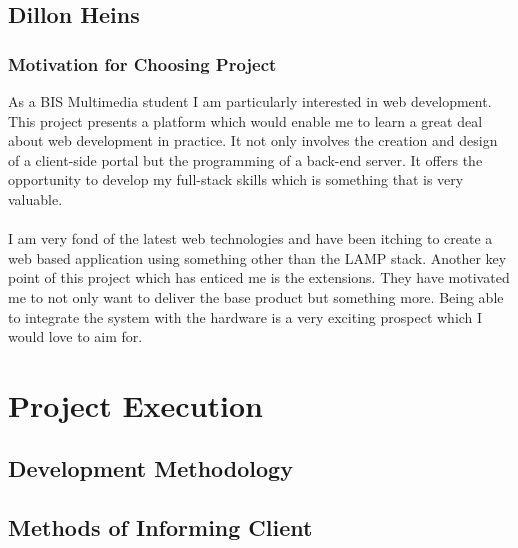 \documentclass{article}
\begin{document}
\cleardoublepage

\subsection{Dillon Heins}

\subsubsection{Motivation for Choosing Project}
As a BIS Multimedia student I am particularly interested in web development. This project presents a platform which would enable me to learn a great deal about web development in practice. It not only involves the creation and design of a client-side portal but the programming of a back-end server. It offers the opportunity to develop my full-stack skills which is something that is very valuable.\\\\
I am very fond of the latest web technologies and have been itching to create a web based application using something other than the LAMP stack. Another key point of this project which has enticed me is the extensions. They have motivated me to not only want to deliver the base product but something more. Being able to integrate the system with the hardware is a very exciting prospect which I would love to aim for.

\cleardoublepage
    
\section{Project Execution}
	\subsection{Development Methodology}
		
	\subsection{Methods of Informing Client}
		
\end{document}
